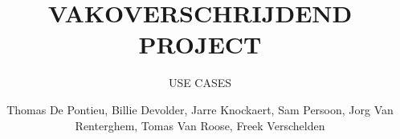 \documentclass[a4paper, twoside, 12pt]{ugent_report}
\begin{document}
\title{VAKOVERSCHRIJDEND PROJECT}
\subtitle{USE CASES\\}
\author{Thomas De Pontieu, Billie Devolder, Jarre Knockaert, Sam Persoon, Jorg Van Renterghem, Tomas Van Roose, Freek Verschelden}
\maketitle

\restoregeometry
\newpage\null\thispagestyle{empty}\newpage
\end{document}
